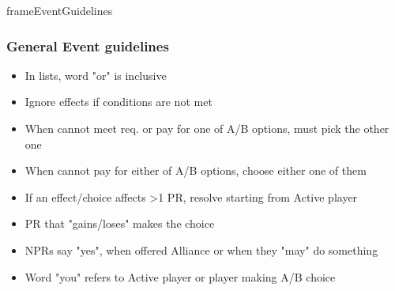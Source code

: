 \documentclass[10pt]{article}
\begin{document}
\begin{dynamiccontents*}{frameEventGuidelines}
	\begin{multicols}{2}
		\subsubsection*{General Event guidelines }
		\begin{itemize}
			\item In lists, word "or" is inclusive
			\item Ignore effects if conditions are not met
			\item When cannot meet req. or pay for one of A/B options, must pick the other one
			\item When cannot pay for either of A/B options, choose either one of them
			\item If an effect/choice affects >1 PR, resolve starting from Active player
			\item PR that "gains/loses" makes the choice
			\item NPRs say "yes", when offered Alliance or when they "may" do something
			\item Word "you" refers to Active player or player making A/B choice
		\end{itemize}
		

\end{multicols}
\end{dynamiccontents*}
\end{document}
